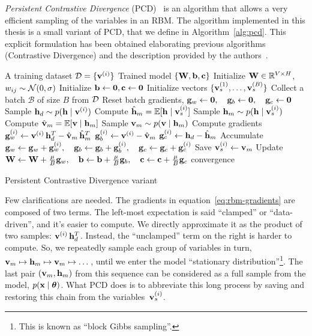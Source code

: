 \emph{Persistent Contrastive Divergence}
(PCD)~\cite{bib:rbm-persistent-cd} is an algorithm that allows a very efficient sampling of the
variables in an RBM. The algorithm implemented in this thesis is a small
variant of PCD, that we define in Algorithm~\ref{alg:pcd}.  This explicit
formulation has been obtained elaborating previous algorithms (Contrastive
Divergence) and the description provided by the
authors~\cite{bib:rbm-persistent-cd}.
\begin{algorithm}[thb]
	\centering
	\begin{algorithmic}[1]
		\Require A training dataset $\mathcal{D} = \{\mathbf{v}^{(i)}\}$
		\Ensure Trained model $\{\mathbf{W}, \mathbf{b}, \mathbf{c}\}$
		\State Initialize $\mathbf{W} \in \mathbb{R}^{V \times H}$,
			$w_{ij} \sim \mathcal{N}(0,\sigma)$
		\State Initialize $\mathbf{b} \gets \mathbf{0}, \mathbf{c} \gets \mathbf{0}$
		\State Initialize vectors $\{\mathbf{v}_s^{(1)}, \dots, \mathbf{v}_s^{(B)}\}$
		\Repeat
			\State Collect a batch $\mathcal{B}$ of size $B$ from $\mathcal{D}$
			\State Reset batch gradients, $\mathbf{g}_w \gets \mathbf{0},
				\quad \mathbf{g}_b \gets \mathbf{0},
				\quad \mathbf{g}_c \gets \mathbf{0}$
				\State Sample $\mathbf{h}_d \sim p(\mathbf{h} \mid \mathbf{v}^{(i)})$
				\State Compute $\hat{\mathbf{h}}_m = \mathbb{E}[\mathbf{h} \mid \mathbf{v}_s^{(i)}]$
				\State Sample $\mathbf{h}_m \sim p(\mathbf{h} \mid \mathbf{v}_s^{(i)})$
				\State Compute $\hat{\mathbf{v}}_m = \mathbb{E}[\mathbf{v} \mid \mathbf{h}_m]$
				\State Sample $\mathbf{v}_m \sim p(\mathbf{v} \mid \mathbf{h}_m)$
				\State Compute gradients 
					\Statex[3] $\mathbf{g}_w^{(i)} \gets
						\mathbf{v}^{(i)}\, \mathbf{h}_d^T - \hat{\mathbf{v}}_m\, \hat{\mathbf{h}}_m^T$
					\Statex[3] $\mathbf{g}_b^{(i)} \gets \mathbf{v}^{(i)} - \hat{\mathbf{v}}_m$
					\Statex[3] $\mathbf{g}_c^{(i)} \gets \mathbf{h}_d - \hat{\mathbf{h}}_m$
				\State Accumulate $\mathbf{g}_w \gets \mathbf{g}_w + \mathbf{g}_w^{(i)},
					\quad \mathbf{g}_b \gets \mathbf{g}_b + \mathbf{g}_b^{(i)},
					\quad \mathbf{g}_c \gets \mathbf{g}_c + \mathbf{g}_c^{(i)}$
				\State Save $\mathbf{v}_s^{(i)} \gets \mathbf{v}_m$
			\EndFor
			\State Update $\mathbf{W} \gets \mathbf{W} + \frac{\mu}{B} \mathbf{g}_w,
				\quad \mathbf{b} \gets \mathbf{b} + \frac{\mu}{B} \mathbf{g}_b,
				\quad \mathbf{c} \gets \mathbf{c} + \frac{\mu}{B} \mathbf{g}_c$
		\Until convergence
	\end{algorithmic}
	\caption{Persistent Contrastive Divergence variant}
	\label{alg:pcd}
\end{algorithm}

Few clarifications are needed. The gradients in
equation~\ref{eq:rbm-gradients} are composed of two terms. The left-most
expectation is said ``clamped'' or ``data-driven'', and it's easier to
compute. We directly approximate it as the product of two samples:
$\mathbf{v}^{(i)}\, \mathbf{h}_d^T$. Instead, the ``unclamped'' term on the right is
harder to compute. So, we repeatedly sample each group of variables in turn,
$\mathbf{v}_m \mapsto \mathbf{h}_m \mapsto \mathbf{v}_m \mapsto \dots$, until we enter the model
``stationary distribution''\footnote{This is known as ``block Gibbs
sampling''.}. The last pair $(\mathbf{v}_m, \mathbf{h}_m)$ from this sequence can be
considered as a full sample from the model, $p(\mathbf{x} \mid \bm{\theta})$. What PCD
does is to abbreviate this long process by saving and restoring this chain
from the variables~$\mathbf{v}_s^{(i)}$.

